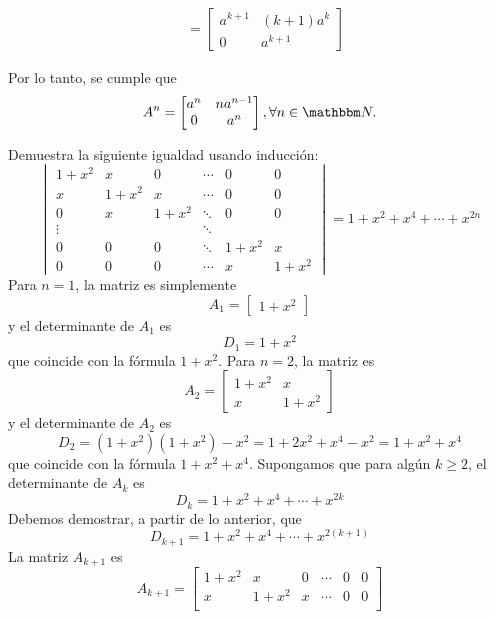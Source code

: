 \begin{example}
\begin{enumerate}[label=\roman*.]
\begin{align*}
            & = \begin{bmatrix}
                a^{k+1} & (k+1)a^k \\
                0 & a^{k+1}
            \end{bmatrix}
        \end{align*}
    \end{enumerate}
    Por lo tanto, se cumple que
    $$A^n = \begin{bmatrix}
        a^n & na^{n-1} \\
        0 & a^n
    \end{bmatrix}, \forall n \in \NN .$$
\end{example}

\begin{example}
    Demuestra la siguiente igualdad usando inducción:
    $$\begin{vmatrix}
        1 + x^2 & x & 0 & \cdots & 0 & 0 \\
        x & 1 + x^2 & x & \cdots & 0 & 0 \\
        0 & x & 1 + x^2 & \ddots & 0 & 0 \\
        \vdots & & & \ddots & & \\
        0 & 0 & 0 & \ddots & 1 + x^2 & x \\
        0 & 0 & 0 & \cdots & x & 1 + x^2
    \end{vmatrix} = 1 + x^2 + x^4 + \cdots + x^{2n}$$
    \demostracion Para $n = 1$, la matriz es simplemente
    $$A_1 = \begin{bmatrix} 1 + x^2 \end{bmatrix}$$\newpage\noindent
    y el determinante de $A_1$ es
    $$D_1 = 1 + x^2$$
    que coincide con la fórmula $1 + x^2$. Para $n = 2$, la matriz es
    $$A_2 = \begin{bmatrix}
        1 + x^2 & x \\
        x & 1 + x^2
    \end{bmatrix}$$
    y el determinante de $A_2$ es
    $$D_2 = (1 + x^2)(1 + x^2) - x^2 = 1 + 2x^2 + x^4 - x^2 = 1 + x^2 + x^4$$
    que coincide con la fórmula $1 + x^2 + x^4$. Supongamos que para algún $k \geq 2$, el determinante de $A_k$ es
    $$D_k = 1 + x^2 + x^4 + \cdots + x^{2k}$$
    Debemos demostrar, a partir de lo anterior, que
    $$D_{k+1} = 1 + x^2 + x^4 + \cdots + x^{2(k+1)}$$
    La matriz $A_{k+1}$ es
    $$A_{k+1} = \begin{bmatrix}
        1 + x^2 & x & 0 & \cdots & 0 & 0 \\
        x & 1 + x^2 & x & \cdots & 0 & 0 \\

\end{bmatrix}$$
\end{example}
